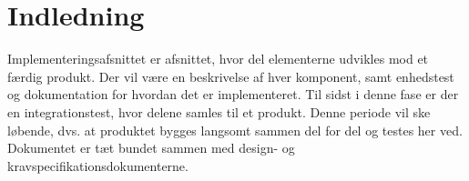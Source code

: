\section{Indledning}
Implementeringsafsnittet er afsnittet, hvor del elementerne udvikles mod et færdig produkt. Der vil være en beskrivelse af hver komponent, samt enhedstest og dokumentation for hvordan det er implementeret. Til sidst i denne fase er der en integrationstest, hvor delene samles til et produkt. Denne periode vil ske løbende, dvs. at produktet bygges langsomt sammen del for del og testes her ved. Dokumentet er tæt bundet sammen med design- og kravspecifikationsdokumenterne.